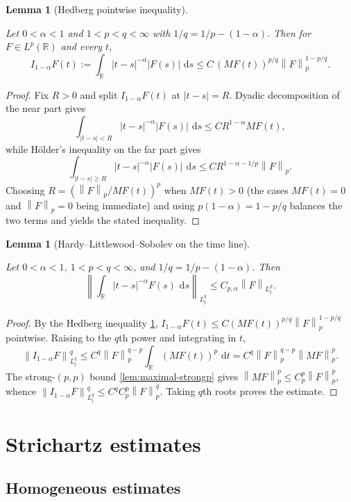 \documentclass[11pt,oneside]{book}
\providecommand{\uses}[1]{}
\newtheorem{lemma}[theorem]{Lemma}
\theoremstyle{definition}
\theoremstyle{remark}
\newcommand{\R}{\mathbb R}
\newcommand{\1}{\mathbf 1}
\newcommand{\dd}{\,\mathrm d}
\newcommand{\norm}[1]{\left\lVert #1\right\rVert}
\newcommand{\abs}[1]{\left\lvert #1\right\rvert}
\begin{document}
\begin{lemma}[Hedberg pointwise inequality]\label{lem:hedberg}
\uses{def:maximal-function}
Let $0<\alpha<1$ and $1<p<q<\infty$ with $1/q=1/p-(1-\alpha)$. Then for
$F\in L^p(\R)$ and every $t$,
\[
 I_{1-\alpha}F(t):=\int_\R\abs{t-s}^{-\alpha}\abs{F(s)}\,\dd s
 \le C\,(MF(t))^{p/q}\norm{F}_{p}^{1-p/q}.
\]
\end{lemma}

\begin{proof}
\uses{def:maximal-function}
Fix $R>0$ and split $I_{1-\alpha}F(t)$ at $\abs{t-s}=R$. Dyadic decomposition
of the near part gives
\[
 \int_{\abs{t-s}<R}\abs{t-s}^{-\alpha}\abs{F(s)}\,\dd s
 \le C R^{1-\alpha}MF(t),
\]
while H\"older's inequality on the far part gives
\[
 \int_{\abs{t-s}\ge R}\abs{t-s}^{-\alpha}\abs{F(s)}\,\dd s
 \le C R^{1-\alpha-1/p}\norm{F}_{p}.
\]
Choosing $R=(\norm{F}_p/MF(t))^{p}$ when $MF(t)>0$ (the cases $MF(t)=0$ and
$\norm{F}_p=0$ being immediate) and using $p(1-\alpha)=1-p/q$ balances the two
terms and yields the stated inequality.
\end{proof}

\begin{lemma}[Hardy--Littlewood--Sobolev on the time line]\label{lem:HLS-time}
\uses{}
Let $0<\alpha<1$, $1<p<q<\infty$, and $1/q=1/p-(1-\alpha)$. Then
\[
 \left\|\int_\R\abs{t-s}^{-\alpha}F(s)\,\dd s\right\|_{L^q_t}
 \le C_{p,\alpha}\norm{F}_{L^p_t}.
\]
\end{lemma}

\begin{proof}
\uses{lem:maximal-strongp, lem:hedberg}
By the Hedberg inequality \cref{lem:hedberg},
$I_{1-\alpha}F(t)\le C(MF(t))^{p/q}\norm{F}_p^{1-p/q}$ pointwise. Raising to the
$q$th power and integrating in $t$,
\[
 \norm{I_{1-\alpha}F}_{L^q_t}^q
 \le C^q\norm{F}_p^{q-p}\int_\R (MF(t))^p\,\dd t
 =C^q\norm{F}_p^{q-p}\norm{MF}_p^{p}.
\]
The strong-$(p,p)$ bound \cref{lem:maximal-strongp} gives
$\norm{MF}_p^p\le C_p^p\norm{F}_p^p$, whence
$\norm{I_{1-\alpha}F}_{L^q_t}^q\le C^q C_p^p\norm{F}_p^q$. Taking $q$th roots
proves the estimate.
\end{proof}


\chapter{Strichartz estimates}\label{chap:strichartz}

\section{Homogeneous estimates}
\end{document}
